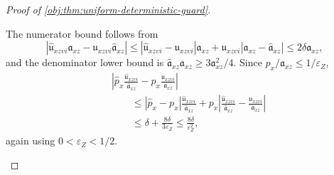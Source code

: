 \begin{proof}[Proof of \cref{obj:thm:uniform-deterministic-guard}]
\begin{enumerate}
\[\]
The numerator bound follows from
\[
|\widehat{\mathfrak u}_{xz\upsilon i}\mathfrak a_{xz}-\mathfrak u_{xz\upsilon i}\widehat{\mathfrak a}_{xz}|
\le
|\widehat{\mathfrak u}_{xz\upsilon i}-\mathfrak u_{xz\upsilon i}|\mathfrak a_{xz}
+
\mathfrak u_{xz\upsilon i}|\mathfrak a_{xz}-\widehat{\mathfrak a}_{xz}|
\le
2\delta\mathfrak a_{xz},
\]
and the denominator lower bound is
\(\widehat{\mathfrak a}_{xz}\mathfrak a_{xz}\ge3\mathfrak a_{xz}^2/4\).  Since
\(p_x/\mathfrak a_{xz}\le1/\varepsilon_Z\),
\[
\begin{aligned}
&\left|
\widehat p_x\frac{\widehat{\mathfrak u}_{xz\upsilon i}}{\widehat{\mathfrak a}_{xz}}
-
p_x\frac{\mathfrak u_{xz\upsilon i}}{\mathfrak a_{xz}}
\right| \\
&\qquad\le
|\widehat p_x-p_x|\frac{\widehat{\mathfrak u}_{xz\upsilon i}}{\widehat{\mathfrak a}_{xz}}
+
p_x\left|
\frac{\widehat{\mathfrak u}_{xz\upsilon i}}{\widehat{\mathfrak a}_{xz}}
-
\frac{\mathfrak u_{xz\upsilon i}}{\mathfrak a_{xz}}
\right| \\
&\qquad\le
\delta+\frac{8\delta}{3\varepsilon_Z}
\le
\frac{8\delta}{\varepsilon_Z^2},
\end{aligned}
\]
again using \(0<\varepsilon_Z<1/2\).


\end{enumerate}
\end{proof}
